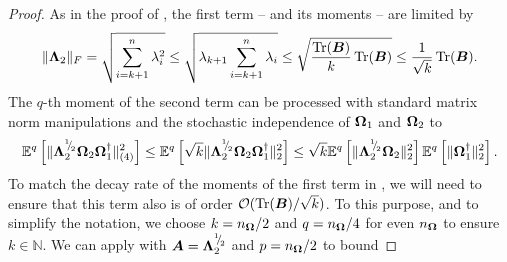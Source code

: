 \documentclass[12pt]{article}
\begin{document}
\begin{proof}
    As in the proof of \cite[lemma 3]{meyer-2021-hutch-optimal}, the first term -- and its moments -- are limited by
    \begin{equation}
        \lVert \boldsymbol{\Lambda}_2 \rVert _F
        = \sqrt{\sum_{i=k+1}^{n} \lambda_i^2}
        \leq \sqrt{ \lambda_{k+1} \sum_{i=k+1}^{n} \lambda_i}
        \leq \sqrt{ \frac{\operatorname{Tr}(\boldsymbol{B})}{k} \operatorname{Tr}(\boldsymbol{B})}
        \leq \frac{1}{\sqrt{k}} \operatorname{Tr}(\boldsymbol{B}).
        \label{equ:nystrom-proof-frobenius-trace}
    \end{equation}
    The $q$-th moment of the second term can be processed with standard matrix norm manipulations and the stochastic independence of $\boldsymbol{\Omega}_1$ and $\boldsymbol{\Omega}_2$ to
    \begin{equation}
        \mathbb{E}^{q}\left[ \lVert \mtx{\Lambda}_2^{\sfrac{1}{2}} \mtx{\Omega}_2 \mtx{\Omega}_1^{\dagger} \rVert _{(4)}^2 \right]
        \leq \mathbb{E}^{q}\left[ \sqrt{k} \lVert \mtx{\Lambda}_2^{\sfrac{1}{2}} \mtx{\Omega}_2 \mtx{\Omega}_1^{\dagger} \rVert _2^2 \right]%
        \leq \sqrt{k} \mathbb{E}^{q}\left[ \lVert \mtx{\Lambda}_2^{\sfrac{1}{2}} \mtx{\Omega}_2 \rVert _2^2\right] \mathbb{E}^{q}\left[ \lVert \mtx{\Omega}_1^{\dagger} \rVert _2^2  \right].%
        \label{equ:nystrom-proof-processed-tail}
    \end{equation}
    To match the decay rate of the moments of the first term in , we will need to ensure that this term also is of order $\mathcal{O}(\operatorname{Tr}(\boldsymbol{B}) / \sqrt{k})$. To this purpose, and to simplify the notation, we choose $k = n_{\boldsymbol{\Omega}}/2$ and $q = n_{\boldsymbol{\Omega}}/4$ for even $n_{\boldsymbol{\Omega}}$ to ensure $k \in \mathbb{N}$. We can apply  with $\boldsymbol{A} = \boldsymbol{\Lambda}_2^{{}^{1}{\mskip -5mu/\mskip -3mu}_{2}}$ and $p = n_{\boldsymbol{\Omega}}/2$ to bound

\end{proof}
\end{document}
